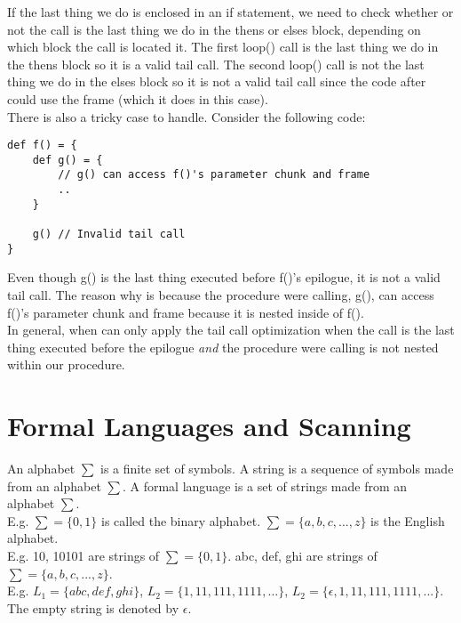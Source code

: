 \documentclass[12pt, letterpaper]{article}
\begin{document}
If the last thing we do is enclosed in an if statement, we need to check whether or not the call is the last thing we do in the thens or elses block, depending on which block the call is located it. The first loop() call is the last thing we do in the thens block so it is a valid tail call. The second loop() call is not the last thing we do in the elses block so it is not a valid tail call since the code after could use the frame (which it does in this case).\\

There is also a tricky case to handle. Consider the following code:
\begin{lstlisting}
def f() = {
	def g() = {
		// g() can access f()'s parameter chunk and frame
		..
	}
	
	g() // Invalid tail call
}
\end{lstlisting}
Even though g() is the last thing executed before f()'s epilogue, it is not a valid tail call. The reason why is because the procedure were calling, g(), can access f()'s parameter chunk and frame because it is nested inside of f().\\

In general, when can only apply the tail call optimization when the call is the last thing executed before the epilogue \emph{and} the procedure were calling is not nested within our procedure.

\newpage

\section{Formal Languages and Scanning}
An alphabet \(\sum\) is a finite set of symbols. A string is a sequence of symbols made from an alphabet \(\sum\). A formal language is a set of strings made from an alphabet \(\sum\).\\

E.g. \(\sum = \{0, 1\}\) is called the binary alphabet. \(\sum = \{a, b, c, ..., z\}\) is the English alphabet.\\

E.g. 10, 10101 are strings of \(\sum = \{0, 1\}\). abc, def, ghi are strings of \(\sum = \{a, b, c, ..., z\}\).\\

E.g. \(L_1 = \{abc, def, ghi\}\), \(L_2 = \{1, 11, 111, 1111, ...\}\), \(L_2 = \{\epsilon, 1, 11, 111, 1111, ...\}\).\\

The empty string is denoted by \(\epsilon\).
\end{document}
